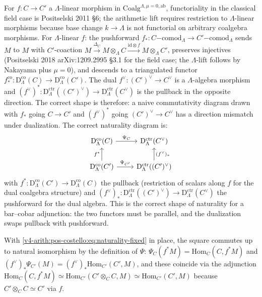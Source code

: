For \(f\colon C\to C'\) a \(\Lambda\)-linear morphism in
\(\mathrm{Coalg}^{\Lambda,\mu=0,\mathrm{ab}}\), functoriality in
the classical field case is Positselski 2011 \S6; the arithmetic
lift requires restriction to \(\Lambda\)-linear morphisms because
base change \(k\to\Lambda\) is not functorial on arbitrary
coalgebra morphisms. For \(\Lambda\)-linear \(f\): the
pushforward \(f_{*}\colon C\mathrm{-comod}_{\Lambda}\to C'\mathrm{-comod}_{\Lambda}\)
sends \(M\) to \(M\) with \(C'\)-coaction
\(M\xrightarrow{\Delta_{C}}M\otimes_{\Lambda}C\xrightarrow{\mathrm{id}\otimes f}M\otimes_{\Lambda}C'\),
preserves injectives (Positselski 2018 arXiv:1209.2995 \S3.1 for
the field case; the \(\Lambda\)-lift follows by Nakayama plus
\(\mu=0\)), and descends to a triangulated functor
\(f_{*}^{\mathrm{co}}\colon\mathrm{D}^{\mathrm{co}}_{\Lambda}(C)\to\mathrm{D}^{\mathrm{co}}_{\Lambda}(C')\).
The dual \(f^{\vee}\colon (C')^{\vee}\to C^{\vee}\) is a
\(\Lambda\)-algebra morphism and
\((f^{\vee})^{*}\colon\mathrm{D}^{\mathrm{ctr}}_{\Lambda}((C')^{\vee})\to\mathrm{D}^{\mathrm{ctr}}_{\Lambda}(C^{\vee})\)
is the pullback in the opposite direction. The correct shape is
therefore: a naive commutativity diagram drawn with \(f_{*}\) going
\(C\to C'\) and \((f^{\vee})^{*}\) going
\((C')^{\vee}\to C^{\vee}\) has a direction mismatch under
dualization. The correct naturality diagram is:
\begin{equation}
\label{v4-arith:pos-costello:eq:naturality-fixed}
\begin{tikzcd}
\mathrm{D}^{\mathrm{co}}_{\Lambda}(C) \ar[r, "\Psi_{C}"] & \mathrm{D}^{\mathrm{ctr}}_{\Lambda}(C^{\vee}) \\
\mathrm{D}^{\mathrm{co}}_{\Lambda}(C') \ar[u, "f^{*}"] \ar[r, "\Psi_{C'}"] & \mathrm{D}^{\mathrm{ctr}}_{\Lambda}((C')^{\vee}) \ar[u, "(f^{\vee})_{*}"']
\end{tikzcd}
\end{equation}
with \(f^{*}\colon\mathrm{D}^{\mathrm{co}}_{\Lambda}(C')\to\mathrm{D}^{\mathrm{co}}_{\Lambda}(C)\)
the pullback (restriction of scalars along \(f\) for the dual
coalgebra structure) and
\((f^{\vee})_{*}\colon\mathrm{D}^{\mathrm{ctr}}_{\Lambda}((C')^{\vee})\to\mathrm{D}^{\mathrm{ctr}}_{\Lambda}(C^{\vee})\)
the pushforward for the dual algebra. This is the correct shape
of naturality for a bar--cobar adjunction: the two functors must
be parallel, and the dualization swaps pullback with pushforward.

With \eqref{v4-arith:pos-costello:eq:naturality-fixed} in place,
the square commutes up to natural isomorphism by the definition
of \(\Psi\): \(\Psi_{C}(f^{*}M)=\mathrm{Hom}_{C}(C,f^{*}M)\) and
\((f^{\vee})_{*}\Psi_{C'}(M)=(f^{\vee})_{*}\mathrm{Hom}_{C'}(C',M)\),
and these coincide via the adjunction
\(\mathrm{Hom}_{C}(C,f^{*}M)\simeq\mathrm{Hom}_{C'}(C'\otimes_{C}C,M)\simeq\mathrm{Hom}_{C'}(C',M)\)
because \(C'\otimes_{C}C\simeq C'\) via \(f\).


